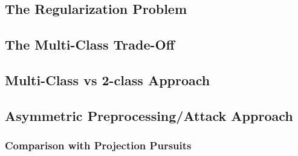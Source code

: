 \subsection{The Regularization Problem}
\subsection{The Multi-Class Trade-Off}
\subsection{Multi-Class vs 2-class Approach}
\subsection{Asymmetric Preprocessing/Attack Approach}
\subsubsection{Comparison with Projection Pursuits}

